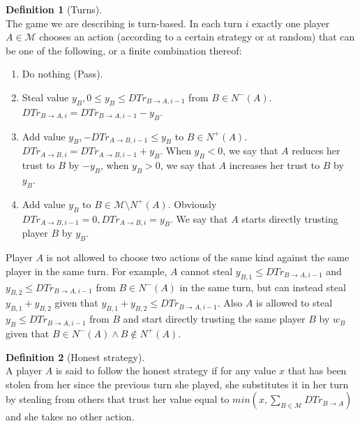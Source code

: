 \documentclass[11pt]{article}
\theoremstyle{definition}
\newtheorem{definition}{Definition}[section]
\theoremstyle{corollary}
\begin{document}
      \begin{definition}[Turns] \ \\
         The game we are describing is turn-based. In each turn $i$ exactly one player $A \in \mathcal{M}$ chooses
         an action (according to a certain strategy or at random) that can be one of the following, or a finite
         combination thereof:
         \begin{enumerate}
            \item Do nothing (Pass).
            \item Steal value $y_B, 0 \leq y_B \leq DTr_{B \rightarrow A, i-1}$ from $B \in N^{-}(A)$.
            $DTr_{B \rightarrow A, i} = DTr_{B \rightarrow A, i-1} - y_B$.
            \item Add value $y_B, -DTr_{A \rightarrow B, i-1} \leq y_B$ to $B \in N^{+}(A)$.
            $DTr_{A \rightarrow B, i} = DTr_{A \rightarrow B, i-1} + y_B$. When $y_B < 0$, we say that $A$ reduces
            her trust to $B$ by $-y_B$, when $y_B > 0$, we say that $A$ increases her trust to $B$ by $y_B$.
            \item Add value $y_B$ to $B \in \mathcal{M} \setminus N^{+}(A)$.
            Obviously $DTr_{A \rightarrow B, i-1} = 0, DTr_{A \rightarrow B, i} = y_B$. We say that $A$ starts directly
            trusting player $B$ by $y_B$.
         \end{enumerate}
         Player $A$ is not allowed to choose two actions of the same kind against the same player in the same turn.
         For example, $A$ cannot steal $y_{B,1} \leq DTr_{B \rightarrow A, i-1}$ and
         $y_{B,2} \leq DTr_{B \rightarrow A, i-1}$ from $B \in N^{-}(A)$ in the same turn, but can instead steal
         $y_{B,1} + y_{B,2}$ given that $y_{B,1} + y_{B,2} \leq DTr_{B \rightarrow A, i-1}$. Also $A$ is allowed
         to steal $y_B \leq DTr_{B \rightarrow A, i-1}$ from $B$ and start directly trusting the same player $B$ by
         $w_B$ given that $B \in N^{-}(A) \wedge B \notin N^{+}(A)$.
      \end{definition}
      \begin{definition}[Honest strategy] \ \\
         A player $A$ is said to follow the honest strategy if for any value $x$ that has been stolen from her since
         the previous turn she played, she substitutes it in her turn by stealing from others that trust her value
         equal to $min(x,\sum\limits_{B \in \mathcal{M}}{DTr_{B \rightarrow A}})$ and she takes no other action.
      \end{definition}
\end{document}

